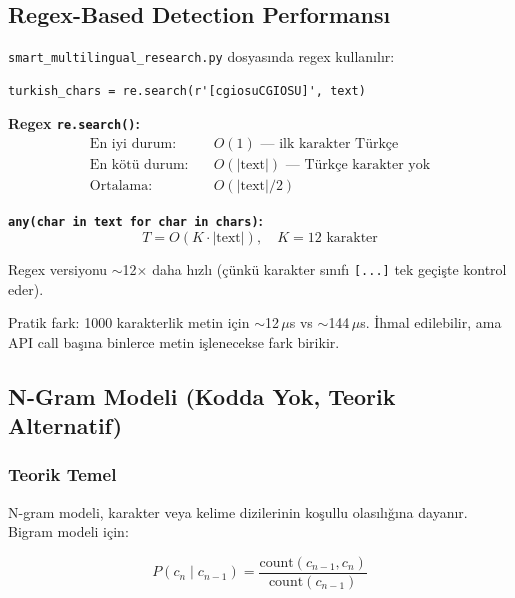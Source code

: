 \subsection{Regex-Based Detection Performans{\i}}

\texttt{smart\_multilingual\_research.py} dosyas{\i}nda regex kullan{\i}l{\i}r:

\begin{lstlisting}
turkish_chars = re.search(r'[cgiosuCGIOSU]', text)
\end{lstlisting}

\begin{formulbox}
\textbf{Regex \texttt{re.search()}:}
\begin{align}
\text{En iyi durum:} &\quad O(1) \text{ --- ilk karakter T\"{u}rk\c{c}e} \\
\text{En k\"{o}t\"{u} durum:} &\quad O(|\text{text}|) \text{ --- T\"{u}rk\c{c}e karakter yok} \\
\text{Ortalama:} &\quad O(|\text{text}|/2)
\end{align}

\textbf{\texttt{any(char in text for char in chars)}:}
\begin{equation}
T = O(K \cdot |\text{text}|), \quad K = 12 \text{ karakter}
\end{equation}

Regex versiyonu $\sim$12$\times$ daha h{\i}zl{\i} (\c{c}\"{u}nk\"{u} karakter s{\i}n{\i}f{\i} \texttt{[...]} tek ge\c{c}i\c{s}te kontrol eder).

Pratik fark: 1000 karakterlik metin i\c{c}in $\sim$12\,$\mu$s vs $\sim$144\,$\mu$s. \.{I}hmal edilebilir, ama API call ba\c{s}{\i}na binlerce metin i\c{s}lenecekse fark birikir.
\end{formulbox}

\subsection{N-Gram Modeli (Kodda Yok, Teorik Alternatif)}

\subsubsection{Teorik Temel}

N-gram modeli, karakter veya kelime dizilerinin ko\c{s}ullu olas{\i}l{\i}\u{g}{\i}na dayan{\i}r. Bigram modeli i\c{c}in:

\begin{equation}
\label{eq:bigram}
P(c_n \mid c_{n-1}) = \frac{\mathrm{count}(c_{n-1}, c_n)}{\mathrm{count}(c_{n-1})}
\end{equation}

